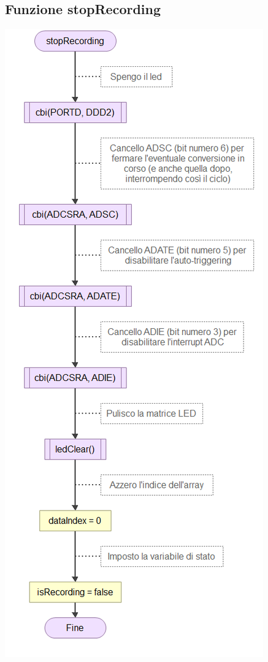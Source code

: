 \documentclass{article}
\begin{document}
\subsection{Funzione stopRecording}
\includegraphics[scale=.60]{funStopRec.png}
\end{document}
